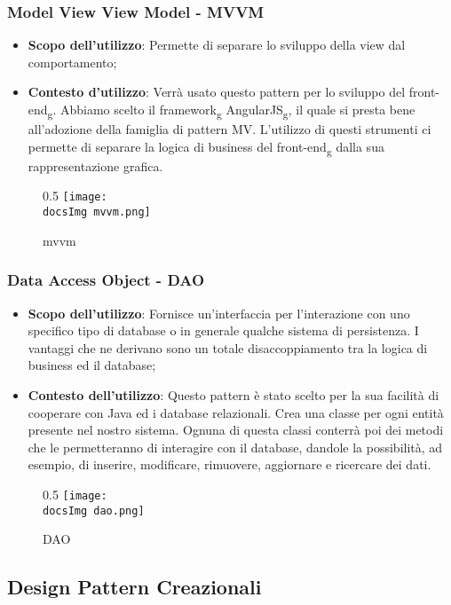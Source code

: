 		\subsubsection{Model View View Model - MVVM}
			\begin{itemize}
				\item \textbf{Scopo dell'utilizzo}: Permette di separare lo sviluppo della view dal comportamento;
				\item \textbf{Contesto d'utilizzo}: Verrà usato questo pattern per lo sviluppo del front-end\textsubscript{g}. Abbiamo scelto il framework\textsubscript{g} AngularJS\textsubscript{g}, il quale si presta bene all'adozione della famiglia di pattern MV. L'utilizzo di questi strumenti ci permette di separare la logica di business del front-end\textsubscript{g} dalla sua rappresentazione grafica.
			\end{itemize}
			\begin{figure}[H]{0.5}
				\centering
				\texttt{[image: \\docsImg mvvm.png]}
				\caption{mvvm}
				\label{fig. Mvvm}
			\end{figure}

		\subsubsection{Data Access Object - DAO }
		\begin{itemize}\itemsep1pt
				\item \textbf{Scopo dell'utilizzo}: Fornisce un'interfaccia per l'interazione con uno specifico tipo di database o in generale qualche sistema di persistenza. I vantaggi che ne derivano sono un totale disaccoppiamento tra la logica di business ed il database;
				\item \textbf{Contesto dell'utilizzo}: Questo pattern è stato scelto per la sua facilità di cooperare con Java ed i database relazionali. Crea una classe per ogni entità presente nel nostro sistema. Ognuna di questa classi conterrà poi dei metodi che le permetteranno di interagire con il database, dandole la possibilità, ad esempio, di inserire, modificare, rimuovere, aggiornare e ricercare dei dati.
		\end{itemize}
		\begin{figure}[H]{0.5}
			\centering
			\texttt{[image: \\docsImg dao.png]}
			\caption{DAO}
			\label{fig. Data Access Object - DAO}
		\end{figure}
	\subsection{Design Pattern Creazionali}
		
